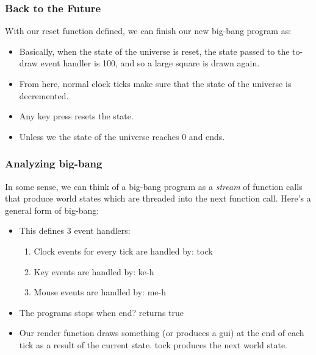 \documentclass{beamer}
\begin{document}

\begin{frame}
  \frametitle{Back to the Future}
  With our reset function defined, we can finish our new big-bang
  program as:
  \pause
  \squareReset
  \begin{itemize}
  \item<3-> Basically, when the state of the universe is reset, the state
    passed to the to-draw event handler is 100, and so a large square is
    drawn again.
  \item<4-> From here, normal clock ticks make sure that the state of the universe
    is decremented.
  \item<5-> Any key press resets the state.
  \item<6-> Unless we the state of the universe reaches 0 and ends.
  \end{itemize}
\end{frame}


\begin{frame}
  \frametitle{Analyzing big-bang}
  In some sense, we can think of a big-bang program as a \emph{stream}
  of function calls that produce world states which are threaded into the next
  function call. Here's a general form of big-bang:
  \pause
  \generalForm
  \begin{itemize}
    \item<3-> This defines 3 event handlers:
      \begin{enumerate}
      \item<4-> Clock events for every tick are handled by: tock
      \item<5-> Key events are handled by: ke-h
      \item<6-> Mouse events are handled by: me-h
      \end{enumerate}
    \item<7-> The programs stops when end? returns true
    \item<8-> Our render function draws something (or produces a gui)
      at the end of each tick as a result of the current state. tock
      produces the next world state.
  \end{itemize}
\end{frame}
\end{document}
